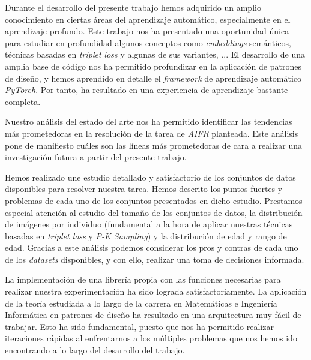 
Durante el desarrollo del presente trabajo hemos adquirido un amplio conocimiento en ciertas áreas del aprendizaje automático, especialmente en el aprendizaje profundo. Este trabajo nos ha presentado una oportunidad única para estudiar en profundidad algunos conceptos como \textit{embeddings} semánticos, técnicas basadas en \textit{triplet loss} y algunas de sus variantes, ... El desarrollo de una amplia base de código nos ha permitido profundizar en la aplicación de patrones de diseño, y hemos aprendido en detalle el \textit{framework} de aprendizaje automático \textit{PyTorch}. Por tanto, ha resultado en una experiencia de aprendizaje bastante completa.

Nuestro análisis del estado del arte nos ha permitido identificar las tendencias más prometedoras en la resolución de la tarea de \textit{AIFR} planteada. Este análisis pone de manifiesto cuáles son las líneas más prometedoras de cara a realizar una investigación futura a partir del presente trabajo.

Hemos realizado une estudio detallado y satisfactorio  de los conjuntos de datos disponibles para resolver nuestra tarea. Hemos descrito los puntos fuertes y problemas de cada uno de los conjuntos presentados en dicho estudio. Prestamos especial atención al estudio del tamaño de los conjuntos de datos, la distribución de imágenes por individuo (fundamental a la hora de aplicar nuestras técnicas basadas en \textit{triplet loss} y \textit{P-K Sampling}) y la distribución de edad y rango de edad. Gracias a este análisis podemos considerar los pros y contras de cada uno de los \textit{datasets} disponibles, y con ello, realizar una toma de decisiones informada.

La implementación de una librería propia con las funciones necesarias para realizar nuestra experimentación ha sido lograda satisfactoriamente. La aplicación de la teoría estudiada a lo largo de la carrera en Matemáticas e Ingeniería Informática en patrones de diseño ha resultado en una arquitectura muy fácil de trabajar. Esto ha sido fundamental, puesto que nos ha permitido realizar iteraciones rápidas al enfrentarnos a los múltiples problemas que nos hemos ido encontrando a lo largo del desarrollo del trabajo.

